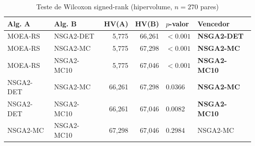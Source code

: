 \begin{table}[ht]
\centering
\caption{Teste de Wilcoxon signed-rank (hipervolume, $n=270$ pares)}
\label{tab:wilcoxon}
\begin{tabular}{llrrll}
\toprule
\textbf{Alg. A} & \textbf{Alg. B} & \textbf{HV(A)} & \textbf{HV(B)} & \textbf{$p$-valor} & \textbf{Vencedor} \\
\midrule
MOEA-RS & NSGA2-DET & 5,775 & 66,261 & $<0.001$ & \textbf{NSGA2-DET} \\
MOEA-RS & NSGA2-MC & 5,775 & 67,298 & $<0.001$ & \textbf{NSGA2-MC} \\
MOEA-RS & NSGA2-MC10 & 5,775 & 67,046 & $<0.001$ & \textbf{NSGA2-MC10} \\
NSGA2-DET & NSGA2-MC & 66,261 & 67,298 & 0.0366 & \textbf{NSGA2-MC} \\
NSGA2-DET & NSGA2-MC10 & 66,261 & 67,046 & 0.0082 & \textbf{NSGA2-MC10} \\
NSGA2-MC & NSGA2-MC10 & 67,298 & 67,046 & 0.2984 & NSGA2-MC \\
\bottomrule
\end{tabular}
\end{table}
